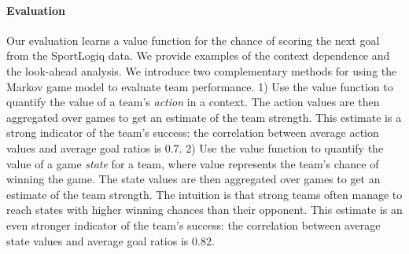 
\paragraph{Evaluation} Our evaluation learns a value function for the chance of scoring the next goal from the SportLogiq data. We provide examples of the context dependence and the look-ahead analysis.
We introduce two complementary methods for using the Markov game model to evaluate team performance. 1) Use the value function to quantify the value of a team's {\em action} in a context. The action values are then aggregated over games to get an estimate of the team strength. This estimate is a strong indicator of the team's success: the correlation between average action values and average goal ratios is 0.7. 2) Use the value function to quantify the value of a game {\em state} for a team, where value represents the team's chance of winning the game. The state values are then aggregated over games to get an estimate of the team strength. The intuition is that strong teams often manage to reach states with higher winning chances than their opponent. This estimate is an even stronger indicator of the team's success:  the correlation between average state values and average goal ratios is 0.82.




